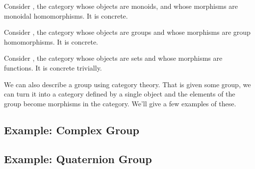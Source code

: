 \begin{ex}\label{ex:Mon}
Consider , the category whose objects are monoids, and whose
morphisms are monoidal homomorphisms. It is concrete.
\end{ex}
\begin{ex}\label{ex:Grp}
Consider , the category whose objects are groups and whose
morphisms are group homomorphisms. It is concrete.
\end{ex}
\begin{ex}\label{ex:Set}
Consider , the category whose objects are sets and whose
morphisms are functions. It is concrete trivially.
\end{ex}

We can also describe a group using category theory. That is given
some group, we can turn it into a category defined by a single
object and the elements of the group become morphisms in the
category. We'll give a few examples of these.
\subsection{Example: Complex Group}

\subsection{Example: Quaternion Group}

